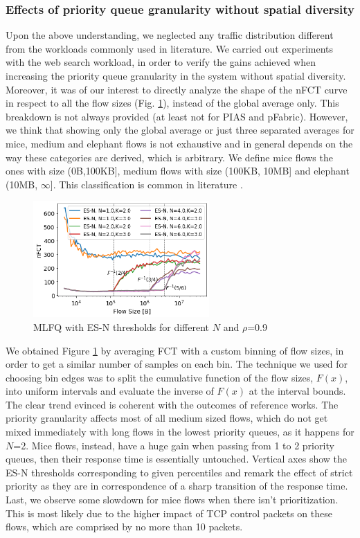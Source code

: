 \subsubsection{Effects of priority queue granularity without spatial diversity}
Upon the above understanding, we neglected any traffic distribution different from the workloads commonly used in literature. We carried out experiments with the web search workload, in order to verify the gains achieved when increasing the priority queue granularity in the system without spatial diversity. Moreover, it was of our interest to directly analyze the shape of the nFCT curve in respect to all the flow sizes (Fig. \ref{fig:esn_varying_N}), instead of the global average only. This breakdown is not always provided (at least not for PIAS and pFabric). However, we think that showing only the global average or just three separated averages for mice, medium and elephant flows is not exhaustive and in general depends on the way these categories are derived, which is arbitrary. We define mice flows the ones with size (0B,100KB], medium flows with size (100KB, 10MB] and elephant (10MB, $\infty$]. This classification is common in literature \cite{pias, nos2, one-more-queue}.\\
\begin{figure}
	\centering
	\includegraphics[width=0.6\textwidth]{Chapter4/Figures/esn}
	\caption{MLFQ with ES-N thresholds for different $N$ and $\rho$=0.9}
	\label{fig:esn_varying_N}
\end{figure}%
We obtained Figure \ref{fig:esn_varying_N} by averaging FCT with a custom binning of flow sizes, in order to get a similar number of samples on each bin. The technique we used for choosing bin edges was to split the cumulative function of the flow sizes, $F(x)$, into uniform intervals and evaluate the inverse of $F(x)$ at the interval bounds. The clear trend evinced is coherent with the outcomes of reference works. The priority granularity affects most of all medium sized flows, which do not get mixed immediately with long flows in the lowest priority queues, as it happens for $N$=2. Mice flows, instead, have a huge gain when passing from 1 to 2 priority queues, then their response time is essentially untouched. Vertical axes show the ES-N thresholds corresponding to given percentiles and remark the effect of strict priority as they are in correspondence of a sharp transition of the response time. Last, we observe some slowdown for mice flows when there isn't prioritization. This is most likely due to the higher impact of TCP control packets on these flows, which are comprised by no more than 10 packets.
